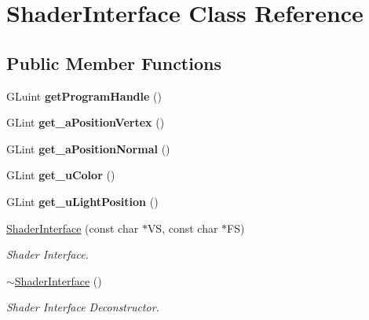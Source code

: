 \hypertarget{class_shader_interface}{}\section{Shader\+Interface Class Reference}
\label{class_shader_interface}
\subsection*{Public Member Functions}
\begin{DoxyCompactItemize}
\item 
\hypertarget{class_shader_interface_ab76abfacd0faa9f2693ee9547e0c4016}{}G\+Luint {\bfseries get\+Program\+Handle} ()\label{class_shader_interface_ab76abfacd0faa9f2693ee9547e0c4016}

\item 
\hypertarget{class_shader_interface_a17097abf04090cfb6cbc223daf76b741}{}G\+Lint {\bfseries get\+\_\+a\+Position\+Vertex} ()\label{class_shader_interface_a17097abf04090cfb6cbc223daf76b741}

\item 
\hypertarget{class_shader_interface_a488d0fcdc9a9e8a1a8fe56bbf60da5b8}{}G\+Lint {\bfseries get\+\_\+a\+Position\+Normal} ()\label{class_shader_interface_a488d0fcdc9a9e8a1a8fe56bbf60da5b8}

\item 
\hypertarget{class_shader_interface_a0b9c60cbfcb284eb24c5ac699ead9da6}{}G\+Lint {\bfseries get\+\_\+u\+Color} ()\label{class_shader_interface_a0b9c60cbfcb284eb24c5ac699ead9da6}

\item 
\hypertarget{class_shader_interface_a90eda5821dd16e1293b436ab7d935ea4}{}G\+Lint {\bfseries get\+\_\+u\+Light\+Position} ()\label{class_shader_interface_a90eda5821dd16e1293b436ab7d935ea4}

\item 
\hyperlink{class_shader_interface_af926096762c79e3333cc6bde76f28271}{Shader\+Interface} (const char $\ast$V\+S, const char $\ast$F\+S)
\begin{DoxyCompactList}\small\item\em Shader Interface. \end{DoxyCompactList}\item 
\hyperlink{class_shader_interface_ae15880a69cd1be43d0e68cab67b66053}{$\sim$\+Shader\+Interface} ()
\begin{DoxyCompactList}\small\item\em Shader Interface Deconstructor. \end{DoxyCompactList}\end{DoxyCompactItemize}


